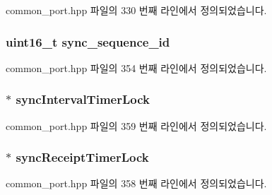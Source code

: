 common\+\_\+port.\+hpp 파일의 330 번째 라인에서 정의되었습니다.

\subsubsection[{\texorpdfstring{sync\+\_\+sequence\+\_\+id}{sync_sequence_id}}]{\setlength{\rightskip}{0pt plus 5cm}uint16\+\_\+t sync\+\_\+sequence\+\_\+id\hspace{0.3cm}{\ttfamily [private]}}\hypertarget{class_common_port_a6e98325c1504ca3d83d1853a0a6a6ed5}{}\label{class_common_port_a6e98325c1504ca3d83d1853a0a6a6ed5}


common\+\_\+port.\+hpp 파일의 354 번째 라인에서 정의되었습니다.

\subsubsection[{\texorpdfstring{sync\+Interval\+Timer\+Lock}{syncIntervalTimerLock}}]{$\ast$ sync\+Interval\+Timer\+Lock\hspace{0.3cm}{\ttfamily [private]}}\hypertarget{class_common_port_a2457c760017e253f1202eb8cfef7c00b}{}\label{class_common_port_a2457c760017e253f1202eb8cfef7c00b}


common\+\_\+port.\+hpp 파일의 359 번째 라인에서 정의되었습니다.

\subsubsection[{\texorpdfstring{sync\+Receipt\+Timer\+Lock}{syncReceiptTimerLock}}]{$\ast$ sync\+Receipt\+Timer\+Lock\hspace{0.3cm}{\ttfamily [private]}}\hypertarget{class_common_port_af6298459c1a6d07a1e3538e4c5698e29}{}\label{class_common_port_af6298459c1a6d07a1e3538e4c5698e29}


common\+\_\+port.\+hpp 파일의 358 번째 라인에서 정의되었습니다.

